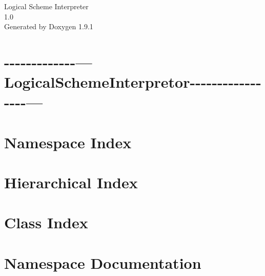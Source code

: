 \let\mypdfximage\pdfximage\def\pdfximage{\immediate\mypdfximage}\documentclass[twoside]{book}
\newcommand{\+}{\discretionary{\mbox{\scriptsize$\hookleftarrow$}}{}{}}
\newcommand{\clearemptydoublepage}{%
  \newpage{\pagestyle{empty}\cleardoublepage}%
}
\begin{document}
\raggedbottom

\hypersetup{pageanchor=false,
             bookmarksnumbered=true,
             pdfencoding=unicode
            }
\begin{titlepage}
\vspace*{7cm}
\begin{center}%
{\Large Logical Scheme Interpreter \\[1ex]\large 1.\+0 }\\
\vspace*{1cm}
{\large Generated by Doxygen 1.9.1}\\
\end{center}
\end{titlepage}
\clearemptydoublepage
{}
\tableofcontents
\clearemptydoublepage
{}
\hypersetup{pageanchor=true}

\chapter{-\/-\/-\/-\/-\/-\/-\/-\/-\/-\/-\/-\/-\/---Logical\+Scheme\+Interpretor-\/-\/-\/-\/-\/-\/-\/-\/-\/-\/-\/-\/-\/-\/-\/-\/-\/---}
\label{md__g___laboratoare__anul__i_i_i__sem__i_i__ingineria__proiectarii__emergency__logically_interpr1ea4bf9f65f59635760cc68ef6b95389}

\chapter{Namespace Index}

\chapter{Hierarchical Index}

\chapter{Class Index}

\chapter{Namespace Documentation}





\end{document}
